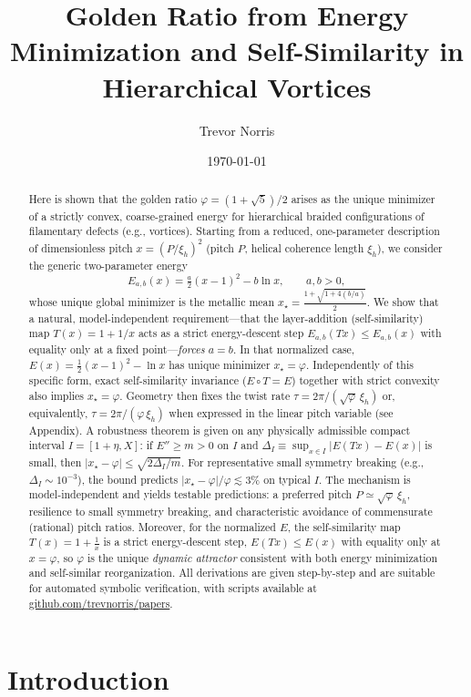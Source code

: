 \documentclass[11pt]{article}
\title{Golden Ratio from Energy Minimization and Self-Similarity in Hierarchical Vortices}
\author{Trevor Norris}
\date{\small \today}
\theoremstyle{remark}
\theoremstyle{definition}
\newcommand{\ph}{\varphi}
\begin{document}
\maketitle

\begin{abstract}
Here is shown that the golden ratio $\ph=(1+\sqrt5)/2$ arises as the unique minimizer of a strictly convex, coarse-grained energy for hierarchical braided configurations of filamentary defects (e.g., vortices). Starting from a reduced, one-parameter description of dimensionless pitch $x=(P/\xi_h)^2$ (pitch $P$, helical coherence length $\xi_h$), we consider the generic two-parameter energy
\[
E_{a,b}(x)=\tfrac{a}{2}(x-1)^2-b\ln x,\qquad a,b>0,
\]
whose unique global minimizer is the metallic mean $x_\star=\tfrac{1+\sqrt{1+4(b/a)}}{2}$. We show that a natural, model-independent requirement---that the layer-addition (self-similarity) map $T(x)=1+1/x$ acts as a strict energy-descent step $E_{a,b}(Tx)\le E_{a,b}(x)$ with equality only at a fixed point---\emph{forces} $a=b$. In that normalized case, $E(x)=\tfrac12(x-1)^2-\ln x$ has unique minimizer $x_\star=\ph$. Independently of this specific form, exact self-similarity invariance ($E\!\circ\!T=E$) together with strict convexity also implies $x_\star=\ph$. Geometry then fixes the twist rate $\tau=2\pi/(\sqrt{\ph}\,\xi_h)$ or, equivalently, $\tau=2\pi/(\ph\,\xi_h)$ when expressed in the linear pitch variable (see Appendix). A robustness theorem is given on any physically admissible compact interval $I=[1+\eta,X]$: if $E''\ge m>0$ on $I$ and $\Delta_I\equiv\sup_{x\in I}|E(Tx)-E(x)|$ is small, then $|x_\star-\ph|\le \sqrt{2\Delta_I/m}$. For representative small symmetry breaking (e.g., $\Delta_I\sim10^{-3}$), the bound predicts $|x_\star-\ph|/\ph\lesssim 3\%$ on typical $I$. The mechanism is model-independent and yields testable predictions: a preferred pitch $P\simeq\sqrt{\ph}\,\xi_h$, resilience to small symmetry breaking, and characteristic avoidance of commensurate (rational) pitch ratios. Moreover, for the normalized $E$, the self-similarity map $T(x)=1+\tfrac{1}{x}$ is a strict energy-descent step, $E(Tx)\le E(x)$ with equality only at $x=\varphi$, so $\varphi$ is the unique \emph{dynamic attractor} consistent with both energy minimization and self-similar reorganization. All derivations are given step-by-step and are suitable for automated symbolic verification, with scripts available at \url{github.com/trevnorris/papers}.
\end{abstract}

\section{Introduction}
\end{document}
